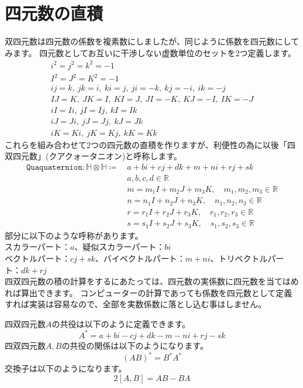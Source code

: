 \documentclass[a4paper,12pt,notitlepage]{jsreport}
\begin{document}
\section{四元数の直積}

双四元数は四元数の係数を複素数にしましたが、同じように係数を四元数にしてみます。
四元数としてお互いに干渉しない虚数単位のセットを2つ定義します。
\begin{gather}
i^2=j^2=k^2=-1\\
I^2=J^2=K^2=-1\\
ij=k,~jk=i,~ki=j,~ji=-k,~kj=-i,~ik=-j\\
IJ=K,~JK=I,~KI=J,~JI=-K,~KJ=-I,~IK=-J\\
iI=Ii,~jI=Ij,~kI=Ik\\
iJ=Ji,~jJ=Jj,~kJ=Jk\\
iK=Ki,~jK=Kj,~kK=Kk
\end{gather}
これらを組み合わせて2つの四元数の直積を作りますが、利便性の為に以後「四双四元数」(クアクォータニオン)と呼称します。
\begin{equation}
\begin{split}
\texttt{Quaquaternion}:\mathbb{H}\otimes\mathbb{H}\coloneq ~&a+bi+cj+dk+m+ni+rj+sk\\
&a,b,c,d\in\mathbb{R}\\
&m=m_1I+m_2J+m_3K,\quad m_1,m_2,m_3\in\mathbb{R}\\
&n=n_1I+n_2J+n_3K,\quad n_1,n_2,n_3\in\mathbb{R}\\
&r=r_1I+r_2J+r_3K,\quad r_1,r_2,r_3\in\mathbb{R}\\
&s=s_1I+s_2J+s_3K,\quad s_1,s_2,s_3\in\mathbb{R}
\end{split}
\end{equation}
部分に以下のような呼称があります。\\
スカラーパート：$a$、疑似スカラーパート：$bi$\\
ベクトルパート：$cj+sk$、バイベクトルパート：$m+ni$、トリベクトルパート：$dk+rj$\\

四双四元数の積の計算をするにあたっては、四元数の実係数に四元数を当てはめれば算出できます。
コンピューターの計算であっても係数を四元数として定義すれば実装は容易なので、全部を実数係数に落とし込む事はしません。

四双四元数$A$の共役は以下のように定義できます。
\begin{equation}
A^*=a+bi-cj+dk-m-ni+rj-sk
\end{equation}
四双四元数$A,B$の共役の関係は以下のようになります。
\begin{equation}
(AB)^*=B^*A^*
\end{equation}
交換子は以下のようになります。
\begin{equation}
2[A,B]=AB-BA
\end{equation}
\end{document}
